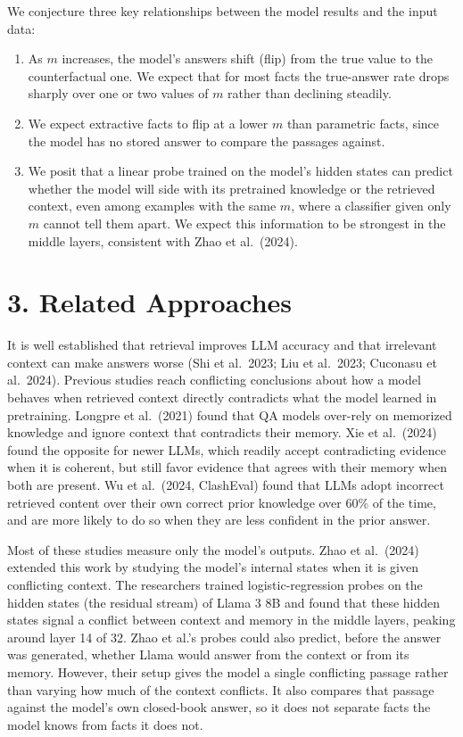 \documentclass[
  12pt,
  letterpaper,
]{article}
\providecommand{\tightlist}{%
  \setlength{\itemsep}{0pt}\setlength{\parskip}{0pt}}
\begin{document}
We conjecture three key relationships between the
model results and the input data:

\begin{enumerate}
\def\labelenumi{\arabic{enumi}.}
\tightlist
\item
  As \(m\) increases, the model's answers shift
  (flip) from the true value to the counterfactual
  one. We expect that for most facts the
  true-answer rate drops sharply over one or two
  values of \(m\) rather than declining steadily.
\item
  We expect extractive facts to flip at a lower
  \(m\) than parametric facts, since the model has
  no stored answer to compare the passages
  against.
\item
  We posit that a linear probe trained on the
  model's hidden states can predict whether the
  model will side with its pretrained knowledge or
  the retrieved context, even among examples with
  the same \(m\), where a classifier given only
  \(m\) cannot tell them apart. We expect this
  information to be strongest in the middle
  layers, consistent with Zhao et al.~(2024).
\end{enumerate}

\section{3. Related
Approaches}\label{related-approaches}

It is well established that retrieval improves LLM
accuracy and that irrelevant context can make
answers worse (Shi et al.~2023; Liu et al.~2023;
Cuconasu et al.~2024). Previous studies reach
conflicting conclusions about how a model behaves
when retrieved context directly contradicts what
the model learned in pretraining. Longpre et
al.~(2021) found that QA models over-rely on
memorized knowledge and ignore context that
contradicts their memory. Xie et al.~(2024) found
the opposite for newer LLMs, which readily accept
contradicting evidence when it is coherent, but
still favor evidence that agrees with their memory
when both are present. Wu et al.~(2024, ClashEval)
found that LLMs adopt incorrect retrieved content
over their own correct prior knowledge over 60\%
of the time, and are more likely to do so when
they are less confident in the prior answer.

Most of these studies measure only the model's
outputs. Zhao et al.~(2024) extended this work by
studying the model's internal states when it is
given conflicting context. The researchers trained
logistic-regression probes on the hidden states
(the residual stream) of Llama 3 8B and found that
these hidden states signal a conflict between
context and memory in the middle layers, peaking
around layer 14 of 32. Zhao et al.'s probes could
also predict, before the answer was generated,
whether Llama would answer from the context or
from its memory. However, their setup gives the
model a single conflicting passage rather than
varying how much of the context conflicts. It also
compares that passage against the model's own
closed-book answer, so it does not separate facts
the model knows from facts it does not.
\end{document}
